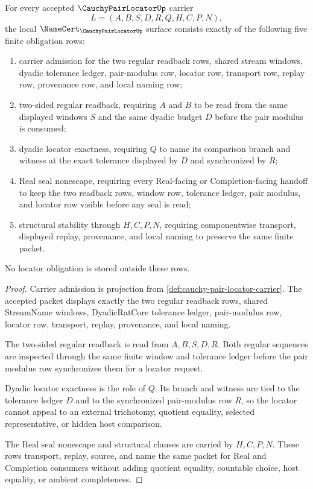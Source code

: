 \begin{theorem}
\label{thm:cauchy-pair-locator-namecert-obligations}
For every accepted $\CauchyPairLocatorUp$ carrier
$$
L=(A,B,S,D,R,Q,H,C,P,N),
$$
the local $\NameCert_{\CauchyPairLocatorUp}$ surface consists exactly of the following five finite obligation rows:
\begin{enumerate}
\item carrier admission for the two regular readback rows, shared stream windows, dyadic tolerance ledger, pair-modulus row, locator row, transport row, replay row, provenance row, and local naming row;
\item two-sided regular readback, requiring $A$ and $B$ to be read from the same displayed windows $S$ and the same dyadic budget $D$ before the pair modulus is consumed;
\item dyadic locator exactness, requiring $Q$ to name its comparison branch and witness at the exact tolerance displayed by $D$ and synchronized by $R$;
\item Real seal nonescape, requiring every Real-facing or Completion-facing handoff to keep the two readback rows, window row, tolerance ledger, pair modulus, and locator row visible before any seal is read;
\item structural stability through $H,C,P,N$, requiring componentwise transport, displayed replay, provenance, and local naming to preserve the same finite packet.
\end{enumerate}
No locator obligation is stored outside these rows.
\end{theorem}
\begin{proof}
Carrier admission is projection from \autoref{def:cauchy-pair-locator-carrier}. The accepted packet displays exactly the two regular readback rows, shared StreamName windows, DyadicRatCore tolerance ledger, pair-modulus row, locator row, transport, replay, provenance, and local naming.

The two-sided regular readback is read from $A,B,S,D,R$. Both regular sequences are inspected through the same finite window and tolerance ledger before the pair modulus row synchronizes them for a locator request.

Dyadic locator exactness is the role of $Q$. Its branch and witness are tied to the tolerance ledger $D$ and to the synchronized pair-modulus row $R$, so the locator cannot appeal to an external trichotomy, quotient equality, selected representative, or hidden host comparison.

The Real seal nonescape and structural clauses are carried by $H,C,P,N$. These rows transport, replay, source, and name the same packet for Real and Completion consumers without adding quotient equality, countable choice, host equality, or ambient completeness.
\end{proof}

